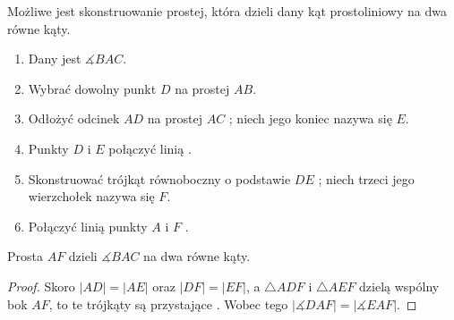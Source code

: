 \documentclass[12pt, a4paper]{scrartcl}
\begin{document}
\begin{theorem}
    Możliwe jest skonstruowanie prostej, która dzieli dany kąt prostoliniowy
    na dwa równe kąty.

    \begin{figure}[!ht]
        \begin{center}
        \end{center}
    \end{figure}

    \begin{enumerate}
        \item Dany jest \(\measuredangle BAC\).
        \item Wybrać dowolny punkt \(D\) na prostej \(AB\).
        \item Odłożyć odcinek \(AD\) na prostej \(AC\) ; niech jego
            koniec nazywa się \(E\).
        \item Punkty \(D\) i \(E\) połączyć linią .
        \item Skonstruować trójkąt równoboczny o podstawie \(DE\) ;
            niech trzeci jego wierzchołek nazywa się \(F\).
        \item Połączyć linią punkty \(A\) i \(F\) .
    \end{enumerate}

    Prosta \(AF\) dzieli \(\measuredangle BAC\) na dwa równe kąty.

    \begin{proof}
        Skoro \(|AD| = |AE|\) oraz \(|DF| = |EF|\), a \(\triangle ADF\) i
        \(\triangle AEF\) dzielą wspólny bok \(AF\), to te trójkąty są
        przystające . Wobec tego \(|\measuredangle DAF| =
        |\measuredangle EAF|\).

    \end{proof}
\end{theorem}
\end{document}
